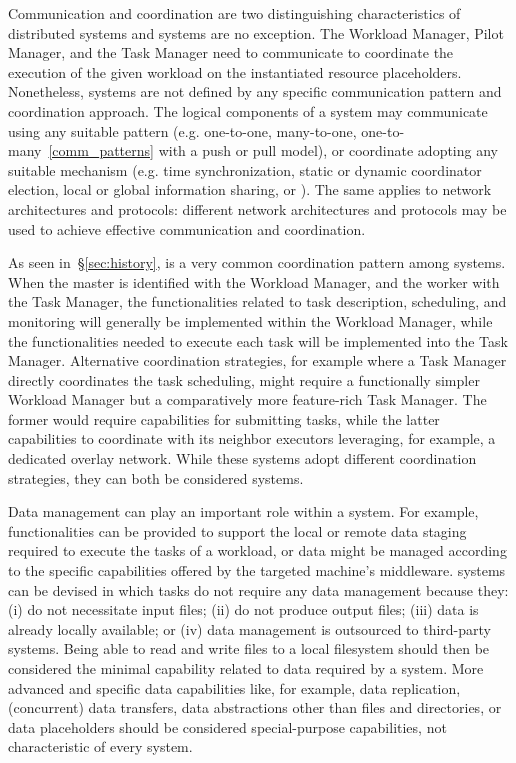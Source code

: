 \documentclass{sig-alternate}
\begin{document}
Communication and coordination are two distinguishing characteristics of
distributed systems and \pilotjob systems are no exception. The Workload
Manager, Pilot Manager, and the Task Manager need to communicate to coordinate
the execution of the given workload on the instantiated resource placeholders.
Nonetheless, \pilotjob systems are not defined by any specific communication
pattern and coordination approach. The logical components of a \pilotjob system
may communicate using any suitable pattern (e.g. one-to-one, many-to-one,
one-to-many~\ref{comm_patterns} with a push or pull model), or coordinate
adopting any suitable mechanism (e.g. time synchronization, static or dynamic
coordinator election, local or global information sharing, or \MW). The same
applies to network architectures and protocols: different network architectures
and protocols may be used to achieve effective communication and coordination.

As seen in~\S\ref{sec:history}, \MW is a very common coordination pattern among
\pilotjob systems. When the master is identified with the Workload Manager, and
the worker with the Task Manager, the functionalities related to task
description, scheduling, and monitoring will generally be implemented within the
Workload Manager, while the functionalities needed to execute each task will be
implemented into the Task Manager. Alternative coordination strategies, for
example where a Task Manager directly coordinates the task scheduling, might
require a functionally simpler Workload Manager but a comparatively more
feature-rich Task Manager. The former would require capabilities for submitting
tasks, while the latter capabilities to coordinate with its neighbor executors
leveraging, for example, a dedicated overlay network. While these systems adopt
different coordination strategies, they can both be considered \pilotjob
systems.

Data management can play an important role within a \pilotjob system. For
example, functionalities can be provided to support the local or remote data
staging required to execute the tasks of a workload, or data might be managed
according to the specific capabilities offered by the targeted machine's
middleware. \pilotjob systems can be devised in which tasks do not require any
data management because they: (i) do not necessitate input files; (ii) do not
produce output files; (iii) data is already locally available; or (iv) data
management is outsourced to third-party systems. Being able to read and write
files to a local filesystem should then be considered the minimal capability
related to data required by a \pilotjob system. More advanced and specific data
capabilities like, for example, data replication, (concurrent) data transfers,
data abstractions other than files and directories, or data placeholders should
be considered special-purpose capabilities, not characteristic of every
\pilotjob system.
\end{document}
